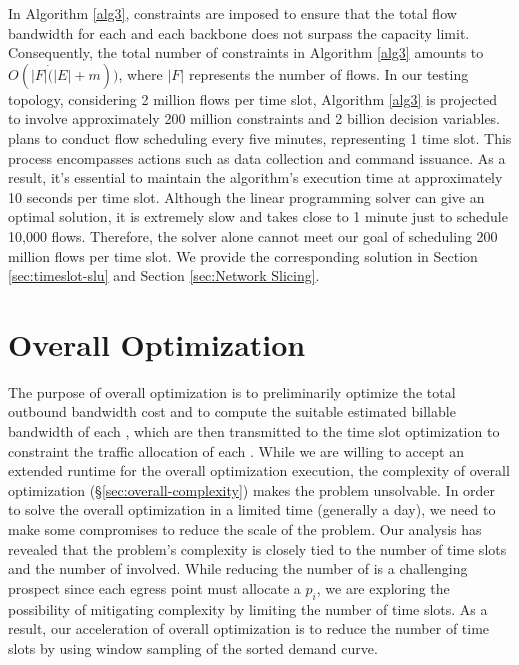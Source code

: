 In Algorithm \ref{alg3}, constraints are imposed to ensure that the total flow bandwidth for each {\egress} and each backbone does not surpass the capacity limit. Consequently, the total number of constraints in Algorithm \ref{alg3} amounts to $O(|F|\dot (|E|+m))$, where $|F|$ represents the number of flows. In our testing topology, considering 2 million flows per time slot, Algorithm \ref{alg3} is projected to involve approximately 200 million constraints and 2 billion decision variables. {\sys} plans to conduct flow scheduling every five minutes, representing 1 time slot. This process encompasses actions such as data collection and command issuance. As a result, it's essential to maintain the algorithm's execution time at approximately 10 seconds per time slot. Although the linear programming solver can give an optimal solution, it is extremely slow and takes close to 1 minute just to schedule 10,000 flows. Therefore, the solver alone cannot meet our goal of scheduling 200 million flows per time slot. We provide the corresponding solution in Section \ref{sec:timeslot-slu} and Section \ref{sec:Network Slicing}.




\section{Overall Optimization}\label{sec:overall-slu}
The purpose of overall optimization is to preliminarily optimize the total outbound bandwidth cost and to compute the suitable estimated billable bandwidth of each {\egress}, which are then transmitted to the time slot optimization to constraint the traffic allocation of each {\egress}. While we are willing to accept an extended runtime for the overall optimization execution, the complexity of overall optimization (\S\ref{sec:overall-complexity}) makes the problem unsolvable. In order to solve the overall optimization in a limited time (generally a day), we need to make some compromises to reduce the scale of the problem. Our analysis has revealed that the problem's complexity is closely tied to the number of time slots and the number of {\egresses} involved. While reducing the number of {\egress} is a challenging prospect since each egress point must allocate a $p_i$, we are exploring the possibility of mitigating complexity by limiting the number of time slots. As a result, our acceleration of overall optimization is to reduce the number of time slots by using window sampling of the sorted demand curve. 

